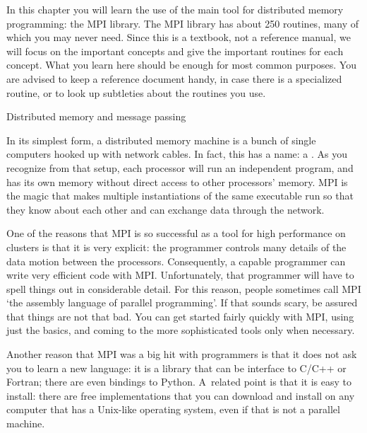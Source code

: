 

In this chapter you will learn the use of the main tool for 
distributed memory programming: the \acf{MPI} library.
The \ac{MPI} library has about 250 routines, many of which you may
never need. Since this is a textbook, not a reference manual, we will
focus on the important concepts and give the important routines for
each concept. What you learn here should be enough for most common
purposes. You are advised to keep a reference document handy, in
case there is a specialized routine, or to look up subtleties about
the routines you use.

 {Distributed memory and message passing}

In its simplest form, a distributed memory machine is a bunch of 
single computers hooked up with network cables. In fact, this has a name:
a . As you recognize from that setup, 
each processor will run an independent program, and has its own memory
without direct access to other processors' memory. MPI is the magic
that makes multiple instantiations of the same executable run
so that they know about each other and can exchange data through the 
network.

One of the reasons that MPI is so successful as a tool for high
performance on clusters is that it is very explicit: the programmer
controls many details of the data motion between the processors.
Consequently, a capable programmer can write very efficient code with MPI.
Unfortunately, that programmer will have to spell things out
in considerable detail. For this reason, people sometimes call MPI
`the assembly language of parallel programming'. If that sounds scary,
be assured that things are not that bad. You can get started 
fairly quickly with MPI, using just the basics,
and coming to the more sophisticated tools 
only when necessary.

Another reason that MPI was a big hit with programmers is that
it does not ask you to learn a new language: it is a library that 
can be interface to C/C++ or Fortran; there are even bindings to Python.
A~related point is that it is easy to install: there are free implementations
that you can download and install on any computer that has a Unix-like
operating system, even if that is not a parallel machine.


